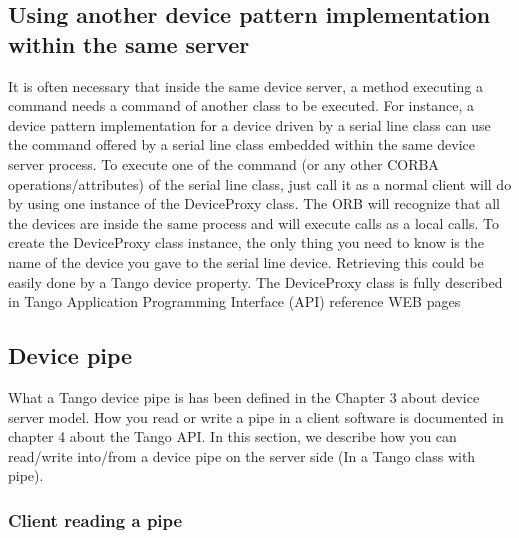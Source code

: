 \subsection{Using another device pattern implementation within the same server}

It is often necessary that inside the same device server,
a method executing a command needs a command of another class to be
executed. For instance, a device pattern implementation for a device
driven by a serial line class can use the command offered by a serial
line class embedded within the same device server process. To execute
one of the command (or any other CORBA operations/attributes)
of the serial line class, just call it as a normal client will do
by using one instance of the DeviceProxy class\emph{.} The ORB will
recognize that all the devices are inside the same process and will
execute calls as a local calls. To create the DeviceProxy
class instance, the only thing you need to know is the name of the
device you gave to the serial line device. Retrieving this could be
easily done by a Tango device property. The DeviceProxy class is fully
described in Tango Application Programming Interface (API) reference
WEB pages

\subsection{Device pipe}

What a Tango device pipe is has been defined in the Chapter 3 about
device server model. How you read or write a pipe in a client software
is documented in chapter 4 about the Tango API. In this section, we
describe how you can read/write into/from a device pipe on the server
side (In a Tango class with pipe).

\subsubsection{Client reading a pipe}

